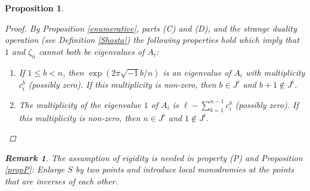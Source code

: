 \documentclass[11pt]{amsart}
\newtheorem{remark}[theorem]{ Remark}
\newtheorem{proposition}[theorem]{Proposition}
\numberwithin{theorem}{subsection}
\begin{document}
{\begin{proposition}
\begin{proof}
By Proposition \ref{enumerative}, parts (C) and (D), and the strange duality operation (see Definition \ref{Shosta}) the following properties hold which imply that $1$ and $\zeta_n$ cannot both be eigenvalues of $A_i$:
\begin{enumerate}
\item If  $1\leq b<n$,  then $\exp(2\pi\sqrt{-1}b/n)$ is an eigenvalue of $A_i$ with multiplicity $c^b_i$ (possibly zero). If this multiplicity is non-zero, then $b\in J^i$ and $b+1\not\in J^i$.
\item The multiplicity of the eigenvalue  $1$ of $A_i$ is  $\ell-\sum_{b=1}^{n-1}c^b_i$ (possibly zero). If this multiplicity is non-zero,  then $n\in J^i$ and $1\not\in J^i$.
\end{enumerate}
\end{proof}
\begin{remark}\label{moreR} The assumption of rigidity is needed in property (P) and Proposition \ref{propP}: Enlarge $S$ by two points and introduce local monodromies at the points that are inverses of each other.
\end{remark}



\end{proposition}}
\end{document}
